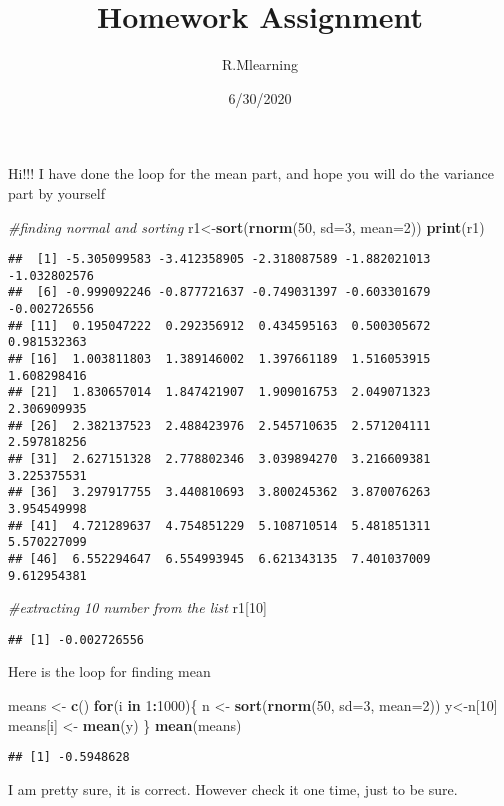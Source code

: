 \documentclass[
]{article}
\title{Homework Assignment}
\author{R.Mlearning}
\date{6/30/2020}
\newenvironment{Shaded}{\begin{snugshade}}{\end{snugshade}}
\newcommand{\CommentTok}[1]{\textcolor[rgb]{0.56,0.35,0.01}{\textit{#1}}}
\newcommand{\ControlFlowTok}[1]{\textcolor[rgb]{0.13,0.29,0.53}{\textbf{#1}}}
\newcommand{\DataTypeTok}[1]{\textcolor[rgb]{0.13,0.29,0.53}{#1}}
\newcommand{\DecValTok}[1]{\textcolor[rgb]{0.00,0.00,0.81}{#1}}
\newcommand{\KeywordTok}[1]{\textcolor[rgb]{0.13,0.29,0.53}{\textbf{#1}}}
\newcommand{\NormalTok}[1]{#1}
\newcommand{\OperatorTok}[1]{\textcolor[rgb]{0.81,0.36,0.00}{\textbf{#1}}}
\newcommand{\StringTok}[1]{\textcolor[rgb]{0.31,0.60,0.02}{#1}}
\begin{document}
\maketitle

Hi!!! I have done the loop for the mean part, and hope you will do the
variance part by yourself

\begin{Shaded}
\begin{Highlighting}[]
\CommentTok{#finding normal and sorting }
\NormalTok{r1<-}\KeywordTok{sort}\NormalTok{(}\KeywordTok{rnorm}\NormalTok{(}\DecValTok{50}\NormalTok{, }\DataTypeTok{sd=}\DecValTok{3}\NormalTok{, }\DataTypeTok{mean=}\DecValTok{2}\NormalTok{))}
\KeywordTok{print}\NormalTok{(r1)}
\end{Highlighting}
\end{Shaded}

\begin{verbatim}
##  [1] -5.305099583 -3.412358905 -2.318087589 -1.882021013 -1.032802576
##  [6] -0.999092246 -0.877721637 -0.749031397 -0.603301679 -0.002726556
## [11]  0.195047222  0.292356912  0.434595163  0.500305672  0.981532363
## [16]  1.003811803  1.389146002  1.397661189  1.516053915  1.608298416
## [21]  1.830657014  1.847421907  1.909016753  2.049071323  2.306909935
## [26]  2.382137523  2.488423976  2.545710635  2.571204111  2.597818256
## [31]  2.627151328  2.778802346  3.039894270  3.216609381  3.225375531
## [36]  3.297917755  3.440810693  3.800245362  3.870076263  3.954549998
## [41]  4.721289637  4.754851229  5.108710514  5.481851311  5.570227099
## [46]  6.552294647  6.554993945  6.621343135  7.401037009  9.612954381
\end{verbatim}

\begin{Shaded}
\begin{Highlighting}[]
\CommentTok{#extracting 10 number from the list}
\NormalTok{r1[}\DecValTok{10}\NormalTok{]}
\end{Highlighting}
\end{Shaded}

\begin{verbatim}
## [1] -0.002726556
\end{verbatim}

Here is the loop for finding mean

\begin{Shaded}
\begin{Highlighting}[]
\NormalTok{means <-}\StringTok{ }\KeywordTok{c}\NormalTok{()}
\ControlFlowTok{for}\NormalTok{(i }\ControlFlowTok{in} \DecValTok{1}\OperatorTok{:}\DecValTok{1000}\NormalTok{)\{}
\NormalTok{  n <-}\StringTok{ }\KeywordTok{sort}\NormalTok{(}\KeywordTok{rnorm}\NormalTok{(}\DecValTok{50}\NormalTok{, }\DataTypeTok{sd=}\DecValTok{3}\NormalTok{, }\DataTypeTok{mean=}\DecValTok{2}\NormalTok{))}
\NormalTok{  y<-n[}\DecValTok{10}\NormalTok{]}
\NormalTok{  means[i] <-}\StringTok{ }\KeywordTok{mean}\NormalTok{(y)}
\NormalTok{  \}}
\KeywordTok{mean}\NormalTok{(means)}
\end{Highlighting}
\end{Shaded}

\begin{verbatim}
## [1] -0.5948628
\end{verbatim}

I am pretty sure, it is correct. However check it one time, just to be
sure.
\end{document}
